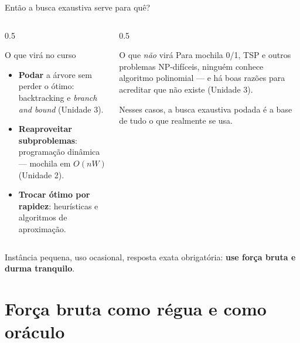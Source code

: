 \documentclass[aspectratio=169]{beamer}
\begin{document}
\begin{frame}{Então a busca exaustiva serve para quê?}
  \begin{columns}[T]
    \begin{column}{0.5\textwidth}
      \begin{block}{O que virá no curso}
        \begin{itemize}
          \item \textbf{Podar} a árvore sem perder o ótimo: backtracking e
            \emph{branch and bound} (Unidade 3).
          \item \textbf{Reaproveitar subproblemas}: programação dinâmica ---
            mochila em $O(nW)$ (Unidade 2).
          \item \textbf{Trocar ótimo por rapidez}: heurísticas e algoritmos de
            aproximação.
        \end{itemize}
      \end{block}
    \end{column}
    \begin{column}{0.5\textwidth}
      \begin{exampleblock}{O que \emph{não} virá}
        Para mochila 0/1, TSP e outros problemas NP-difíceis, ninguém conhece
        algoritmo polinomial --- e há boas razões para acreditar que não existe
        (Unidade 3).

        \medskip
        Nesses casos, a busca exaustiva podada é a base de tudo o que
        realmente se usa.
      \end{exampleblock}
    \end{column}
  \end{columns}
  \vfill
  \begin{center}
    \small Instância pequena, uso ocasional, resposta exata obrigatória:
    \textbf{use força bruta e durma tranquilo}.
  \end{center}
\end{frame}

\section{Força bruta como régua e como oráculo}
\end{document}
